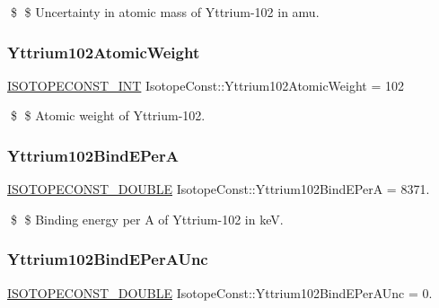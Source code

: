 \$ \$ Uncertainty in atomic mass of Yttrium-\/102 in amu. \mbox{\label{group___isotope_const-_yttrium-_y102_ga39edbc7bf0d20983f093619fbd06587a}} 
\subsubsection{\texorpdfstring{Yttrium102\+Atomic\+Weight}{Yttrium102AtomicWeight}}
{\footnotesize\ttfamily \mbox{\hyperlink{group___isotope_const-_macros_ga5f18360b3e99483a35c32d789e62621c}{I\+S\+O\+T\+O\+P\+E\+C\+O\+N\+S\+T\+\_\+\+I\+NT}} Isotope\+Const\+::\+Yttrium102\+Atomic\+Weight = 102}

\$ \$ Atomic weight of Yttrium-\/102. \mbox{\label{group___isotope_const-_yttrium-_y102_ga908d3d65f1f0da4b7409af844675d680}} 
\subsubsection{\texorpdfstring{Yttrium102\+Bind\+E\+PerA}{Yttrium102BindEPerA}}
{\footnotesize\ttfamily \mbox{\hyperlink{group___isotope_const-_macros_ga8f45a7272ce02c0b4c65c44636ed719a}{I\+S\+O\+T\+O\+P\+E\+C\+O\+N\+S\+T\+\_\+\+D\+O\+U\+B\+LE}} Isotope\+Const\+::\+Yttrium102\+Bind\+E\+PerA = 8371.}

\$ \$ Binding energy per A of Yttrium-\/102 in keV. \mbox{\label{group___isotope_const-_yttrium-_y102_ga31f17abf5579bdb35d9847e4b31ca865}} 
\subsubsection{\texorpdfstring{Yttrium102\+Bind\+E\+Per\+A\+Unc}{Yttrium102BindEPerAUnc}}
{\footnotesize\ttfamily \mbox{\hyperlink{group___isotope_const-_macros_ga8f45a7272ce02c0b4c65c44636ed719a}{I\+S\+O\+T\+O\+P\+E\+C\+O\+N\+S\+T\+\_\+\+D\+O\+U\+B\+LE}} Isotope\+Const\+::\+Yttrium102\+Bind\+E\+Per\+A\+Unc = 0.}

